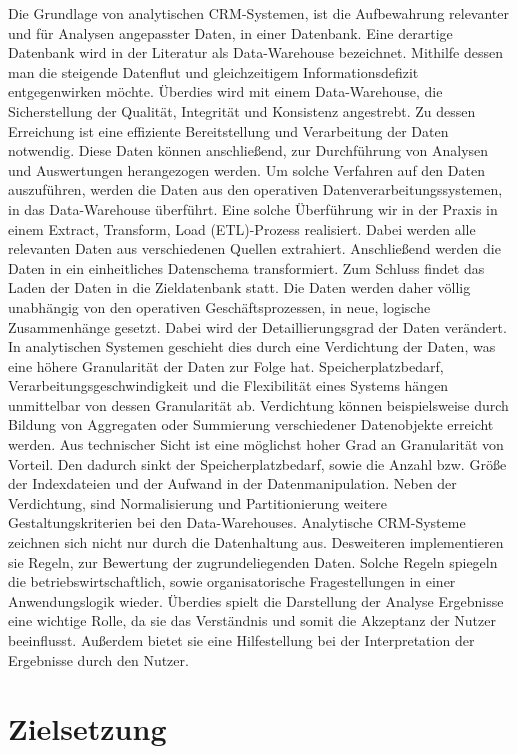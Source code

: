 Die Grundlage von analytischen CRM-Systemen, ist die Aufbewahrung relevanter und für Analysen angepasster Daten, in einer Datenbank. Eine derartige Datenbank wird in der Literatur als Data-Warehouse bezeichnet. Mithilfe dessen man die steigende Datenflut und gleichzeitigem Informationsdefizit entgegenwirken möchte. Überdies wird mit einem Data-Warehouse, die Sicherstellung der Qualität, Integrität und Konsistenz angestrebt. Zu dessen Erreichung ist eine effiziente Bereitstellung und Verarbeitung der Daten notwendig. Diese Daten können anschließend, zur Durchführung von Analysen und Auswertungen herangezogen werden. Um solche Verfahren auf den Daten auszuführen, werden die Daten aus den operativen Datenverarbeitungssystemen, in das Data-Warehouse überführt. Eine solche Überführung wir in der Praxis in einem Extract, Transform, Load (ETL)-Prozess realisiert. Dabei werden alle relevanten Daten aus verschiedenen Quellen extrahiert. Anschließend werden die Daten in ein einheitliches Datenschema transformiert. Zum Schluss findet das Laden der Daten in die Zieldatenbank statt. 
Die Daten werden daher völlig unabhängig von den operativen Geschäftsprozessen, in neue, logische Zusammenhänge gesetzt. Dabei wird der Detaillierungsgrad der Daten verändert. In analytischen Systemen geschieht dies durch eine Verdichtung der Daten, was eine höhere Granularität der Daten zur Folge hat. Speicherplatzbedarf,  Verarbeitungsgeschwindigkeit und die Flexibilität eines Systems hängen unmittelbar von dessen Granularität ab. Verdichtung können beispielsweise durch Bildung von Aggregaten oder Summierung verschiedener Datenobjekte erreicht werden. Aus technischer Sicht ist eine möglichst hoher Grad an Granularität von Vorteil. Den dadurch sinkt der Speicherplatzbedarf, sowie die Anzahl bzw. Größe der Indexdateien und der Aufwand in der Datenmanipulation. Neben der Verdichtung, sind Normalisierung und Partitionierung weitere Gestaltungskriterien bei den Data-Warehouses. Analytische CRM-Systeme zeichnen sich nicht nur durch die Datenhaltung aus. Desweiteren implementieren sie Regeln, zur Bewertung der zugrundeliegenden Daten. Solche Regeln spiegeln die betriebswirtschaftlich, sowie organisatorische Fragestellungen in einer Anwendungslogik wieder. Überdies spielt die Darstellung der Analyse Ergebnisse eine wichtige Rolle, da sie das Verständnis und somit die Akzeptanz der Nutzer beeinflusst. Außerdem bietet sie eine Hilfestellung bei der Interpretation der Ergebnisse durch den Nutzer.

\section{Zielsetzung}
\label{ch:Einfuehrung:sec:Zielsetzung}

